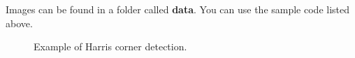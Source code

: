 \documentclass[a4paper]{article}
\begin{document}
Images can be found in a folder called \textbf{data}. You can use the sample code listed above.
\begin{figure}[thpb]
	\setlength{\fboxrule}{0.0pt}      
	\caption{Example of Harris corner detection.}
\end{figure}
\end{document}
